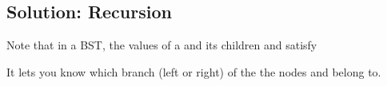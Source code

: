 \documentclass[letterpaper,12pt,english]{book}
\begin{document}
\subsection{Solution: Recursion}
\label{\detokenize{Binary_Tree/235_Lowest_Common_Ancestor_of_a_Binary_Search_Tree:solution-recursion}}
\sphinxAtStartPar
Note that in a BST, the values of a  and its children  and  satisfy

\begin{sphinxVerbatim}[commandchars=\\\{\}]
    
\end{sphinxVerbatim}

\sphinxAtStartPar
It lets you know which branch (left or right) of the  the nodes  and  belong to.
\end{document}
